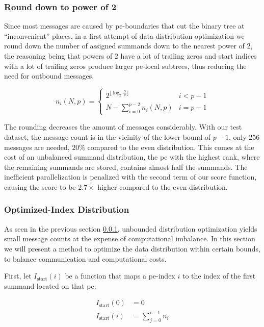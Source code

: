 \subsubsection{Round down to power of 2}
\label{sec:roundDownPower2Distribution}
Since most messages are caused by \gls{pe}-boundaries that cut the binary tree at \enquote{inconvenient} places, in a first attempt of data distribution
optimization we round down the number of assigned summands down to the nearest power of $2$,
the reasoning being that powers of $2$ have a lot of trailing
zeros and start indices with a lot of trailing zeros produce larger \gls{pe}-local subtrees, thus reducing the need for outbound messages.

\begin{equation}
\label{eq:roundDownPower2Distribution}
n_i (N, p) = \begin{cases}
2^{\lfloor \log_2 \frac{N}{p} \rfloor} & i < p - 1\\
N - \sum_{i=0}^{p-2} n_i (N,p) & i = p - 1
\end{cases}
\end{equation}

The rounding decreases the amount of messages considerably. With our test dataset, the message count is in the vicinity of the lower bound of $p - 1$, only
256 messages are needed, $20\%$ compared to the even distribution. This comes at the cost of an unbalanced summand distribution, the \gls{pe}
with the highest rank, where the remaining summands are stored, contains almost half the summands.
The inefficient parallelization is penalized with the second term of our score function, causing the score to be $2.7\times$ higher compared to
the even distribution.

\subsubsection{Optimized-Index Distribution}
As seen in the previous section \ref{sec:roundDownPower2Distribution}, unbounded distribution optimization yields small message counts at the expense
of computational imbalance. In this section we will present a method to optimize the data distribution within certain bounds, to balance communication
and computational costs.

First, let $I_\textrm{start}(i)$ be a function that maps a \gls{pe}-index $i$ to the index of the first summand located on that \gls{pe}:

\begin{align}
\label{eq:startIndexDefinition}
I_\textrm{start}(0) &= 0 \\
I_\textrm{start}(i) &= \sum_{j=0}^{i - 1} n_i
\end{align}

